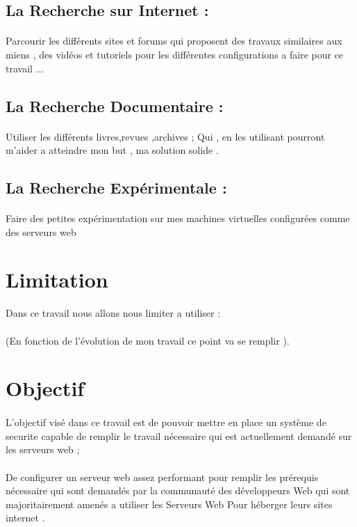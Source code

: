   \subsection{ La Recherche sur Internet :}
  \paragraph{ }
  Parcourir les différents  sites et forums qui proposent des travaux similaires aux miens , des vidéos et tutoriels pour les différentes configurations a faire  pour ce travail ...
    \subsection{La Recherche Documentaire :}
    \paragraph{ }
    Utiliser les différents livres,revues ,archives ;
    Qui , en les utilisant pourront m'aider a atteindre mon but , ma solution solide .
  \subsection{ La Recherche Expérimentale :}
  \paragraph{ }
  Faire des petites expérimentation sur mes machines virtuelles configurées comme des serveurs web  
  \section{Limitation}
  Dans ce travail nous allons nous limiter a utiliser :
  \paragraph{ } (En fonction de l’évolution de mon travail ce point va se remplir ).
  \section{Objectif}
  
  \paragraph{ }L'objectif visé  dans ce travail est de pouvoir mettre en place un système de securite capable de remplir le travail nécessaire qui est actuellement demandé  sur les serveurs web ;
  \paragraph{ } De configurer un serveur web assez performant pour remplir les prérequis    nécessaire qui sont demandés par la communauté  des développeurs   Web qui sont majoritairement amenés a utiliser les Serveurs Web Pour héberger leurs sites internet  .

 
   
   

   
   
     
 
